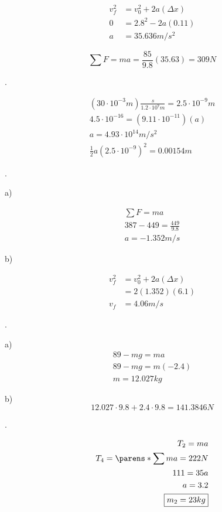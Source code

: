 \documentclass{scrreprt} %
\begin{document}
\begin{align*}
	v_f^2 &= v_0^2 + 2a(\Delta x) \\
	0 &= 2.8^2 - 2a(0.11) \\
	a &= 35.636 m/s^2
\end{align*}

$$
\sum F = ma = \frac{85}{9.8}(35.63) = \boxed{309N}
$$

.

\begin{align*}
	(30\cdot 10^{-3} m)\frac{s}{1.2\cdot 10^7 m} = 2.5 \cdot 10^{-9} m \\
	4.5\cdot 10^{-16} = (9.11\cdot 10^{-11})(a) \\
	a = 4.93\cdot 10^{14} m/s^2 \\
	\frac{1}{2} a (2.5\cdot 10^{-9})^2 = \boxed{0.00154 m}
\end{align*}

.

a)

\begin{align*}
	\sum F = ma \\
	387 - 449 = \frac{449}{9.8} \\
	\boxed{a = -1.352 m/s}
\end{align*}

b)

\begin{align*}
	v_f^2 &= v_0^2 + 2a(\Delta x) \\
		  &= 2(1.352)(6.1) \\
	  v_f &= \boxed{4.06 m/s}
\end{align*}

.

a) \begin{align*}
	89 - mg = ma \\ 
	89 - mg = m(-2.4) \\
	\boxed{m = 12.027 kg}
\end{align*}

b) $$12.027\cdot 9.8 + 2.4\cdot 9.8 = \boxed{141.3846 N}$$

.

\begin{align*}
	T_2 = ma \\
	T_4 = \parens*{{\sum m}}a = 222N \\
	111 = 35a \\
	a = 3.2 \\
	\boxed{m_2 = 23 kg}
\end{align*}
\end{document}
